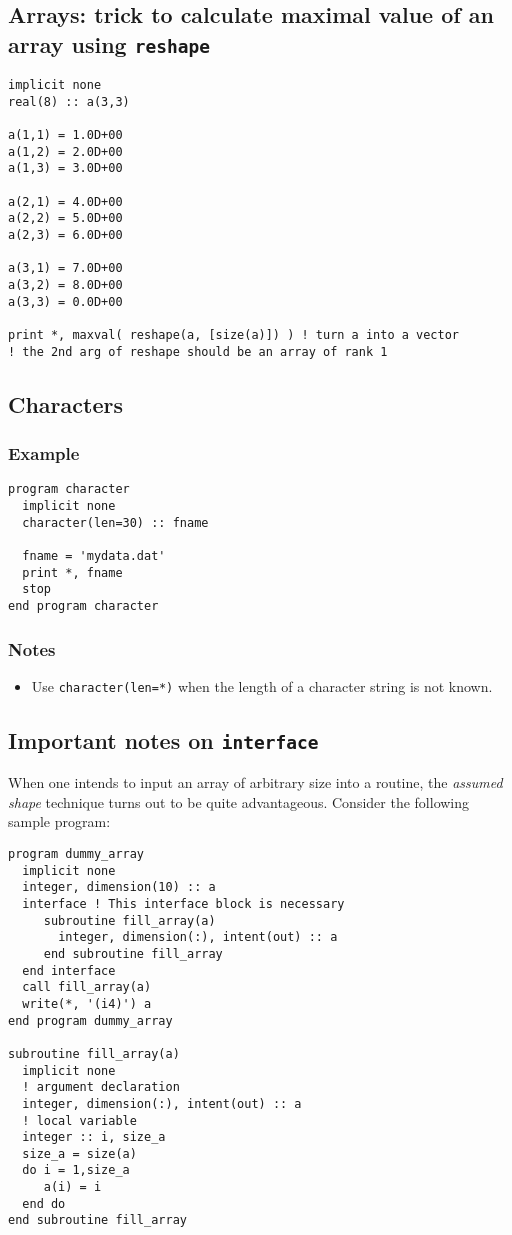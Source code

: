 \documentclass[11pt]{article}
\begin{document}
\subsection{Arrays: trick to calculate maximal value of an array using \texttt{reshape}}
\label{sec:orgc1f2cdc}
\begin{verbatim}
implicit none
real(8) :: a(3,3)

a(1,1) = 1.0D+00
a(1,2) = 2.0D+00
a(1,3) = 3.0D+00

a(2,1) = 4.0D+00
a(2,2) = 5.0D+00
a(2,3) = 6.0D+00

a(3,1) = 7.0D+00
a(3,2) = 8.0D+00
a(3,3) = 0.0D+00

print *, maxval( reshape(a, [size(a)]) ) ! turn a into a vector
! the 2nd arg of reshape should be an array of rank 1
\end{verbatim}

\subsection{Characters}
\label{sec:org2db8d92}
\subsubsection{Example}
\label{sec:orgbbc7a5a}
\begin{verbatim}
program character
  implicit none
  character(len=30) :: fname

  fname = 'mydata.dat'
  print *, fname
  stop
end program character
\end{verbatim}
\subsubsection{Notes}
\label{sec:orgbc35629}
\begin{itemize}
\item Use \texttt{character(len=*)} when the length of a character string is not known.
\end{itemize}
\subsection{Important notes on \texttt{interface}}
\label{sec:orgf599c6c}
When one intends to input an array of arbitrary size into a routine, the \emph{assumed shape} technique turns out to be quite advantageous. Consider the following sample program:

\begin{verbatim}
program dummy_array
  implicit none
  integer, dimension(10) :: a
  interface ! This interface block is necessary
     subroutine fill_array(a)
       integer, dimension(:), intent(out) :: a
     end subroutine fill_array
  end interface
  call fill_array(a)
  write(*, '(i4)') a
end program dummy_array

subroutine fill_array(a)
  implicit none
  ! argument declaration
  integer, dimension(:), intent(out) :: a
  ! local variable
  integer :: i, size_a
  size_a = size(a)
  do i = 1,size_a
     a(i) = i
  end do
end subroutine fill_array
\end{verbatim}
\end{document}
